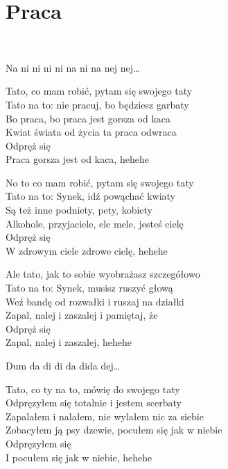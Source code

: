 \documentclass[a5paper, 10pt]{book}
\begin{document}
\section{Praca}\textcolor{lightgray}{\textit{}}\\
\begin{minipage}[t]{0.8\textwidth}
  Na ni ni ni ni na ni na nej nej…\vspace*{1.6mm}

  Tato, co mam robić, pytam się swojego taty\\
  Tato na to: nie pracuj, bo będziesz garbaty\\
  Bo praca, bo praca jest gorsza od kaca\\
  Kwiat świata od życia ta praca odwraca\\
  \hspace*{5mm}Odpręż się\\
  \hspace*{5mm}Praca gorsza jest od kaca, hehehe\vspace*{1.6mm}

  No to co mam robić, pytam się swojego taty\\
  Tato na to: Synek, idź powąchać kwiaty\\
  Są też inne podniety, pety, kobiety\\
  Alkohole, przyjaciele, ele mele, jesteś cielę\\
  \hspace*{5mm}Odpręż się\\
  \hspace*{5mm}W zdrowym ciele zdrowe cielę, hehehe\vspace*{1.6mm}

  Ale tato, jak to sobie wyobrażasz szczegółowo\\
  Tato na to: Synek, musisz ruszyć głową\\
  Weź bandę od rozwałki i ruszaj na działki\\
  Zapal, nalej i zaszalej i pamiętaj, że\\
  \hspace*{5mm}Odpręż się\\
  \hspace*{5mm}Zapal, nalej i zaszalej, hehehe\vspace*{1.6mm}

  Dum da di di da dida dej…\vspace*{1.6mm}

  Tato, co ty na to, mówię do swojego taty\\
  Odpręzyłem się totalnie i jestem scerbaty\\
  Zapalałem i nalałem, nie wylałem nic za siebie\\
  Zobacyłem ją psy dzewie, pocułem się jak w niebie\\
  \hspace*{5mm}Odpręzyłem się\\
  \hspace*{5mm}I pocułem się jak w niebie, hehehe\vspace*{1.6mm}


\end{minipage}
\end{document}
